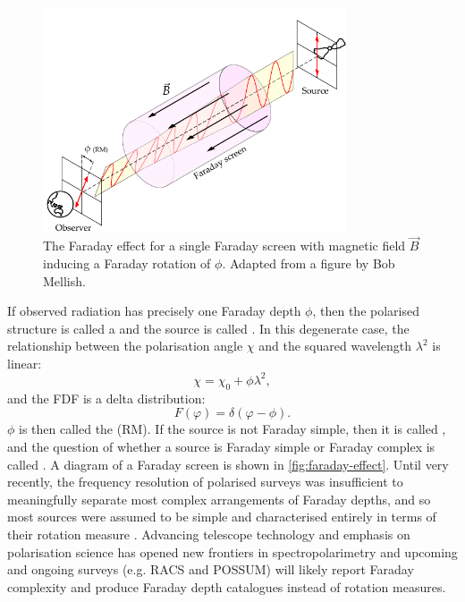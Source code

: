         \begin{figure}
            \centering
            \includegraphics[width=0.8\textwidth]{images/Faraday-effect.pdf}
            \caption[A Faraday screen.]{\label{fig:faraday-effect} The Faraday effect for a single Faraday screen with magnetic field $\vec B$ inducing a Faraday rotation of $\phi$. Adapted from a figure by Bob Mellish.}
        \end{figure}

        If observed radiation has precisely one Faraday depth $\phi$, then the polarised structure is called a  and the source is called . In this degenerate case, the relationship between the polarisation angle $\chi$ and the squared wavelength $\lambda^2$ is linear:
        \begin{equation}
            \chi = \chi_0 + \phi \lambda^2,
        \end{equation}
        and the FDF is a delta distribution:
        \begin{equation}
            F(\varphi) = \delta(\varphi - \phi).
        \end{equation}
        $\phi$ is then called the  (RM). If the source is not Faraday simple, then it is called , and the question of whether a source is Faraday simple or Faraday complex is called . A diagram of a Faraday screen is shown in \autoref{fig:faraday-effect}. Until very recently, the frequency resolution of polarised surveys was insufficient to meaningfully separate most complex arrangements of Faraday depths, and so most sources were assumed to be simple and characterised entirely in terms of their rotation measure \citep[e.g.][]{taylor_rotation_2009}. Advancing telescope technology and emphasis on polarisation science has opened new frontiers in spectropolarimetry and upcoming and ongoing surveys (e.g. RACS and POSSUM) will likely report Faraday complexity and produce Faraday depth catalogues instead of rotation measures.


